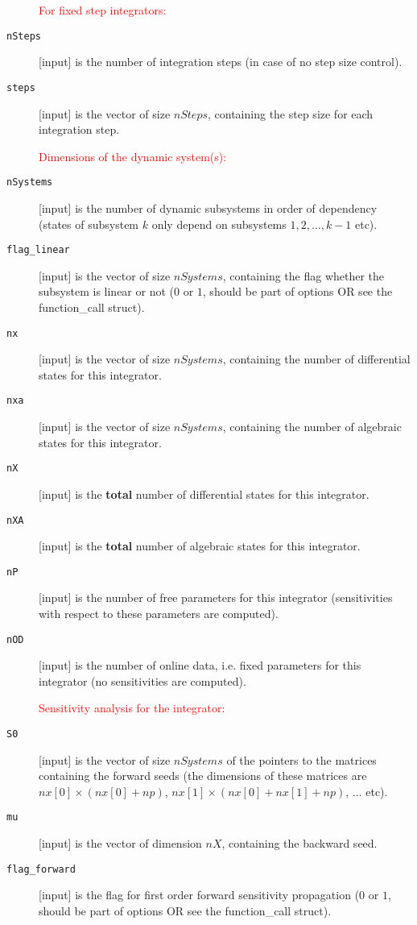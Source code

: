 \documentclass{report}
\begin{document}
\begin{description}
\item[] \textcolor{red}{For fixed step integrators:}
\item[{\tt nSteps}] [input] is the number of integration steps (in case of no step size control).
\item[{\tt steps}] [input] is the vector of size $nSteps$, containing the step size for each integration step.
\item[] \textcolor{red}{Dimensions of the dynamic system(s):}
\item[{\tt nSystems}] [input] is the number of dynamic subsystems in order of dependency (states of subsystem $k$ only depend on subsystems $1,2,\ldots, k-1$ etc).
\item[{\tt flag\_linear}] [input] is the vector of size $nSystems$, containing the flag whether the subsystem is linear or not ($0$ or $1$, should be part of options OR see the function\_call struct).
\item[{\tt nx}] [input] is the vector of size $nSystems$, containing the number of differential states for this integrator.
\item[{\tt nxa}] [input] is the vector of size $nSystems$, containing the number of algebraic states for this integrator.
\item[{\tt nX}] [input] is the {\bf total} number of differential states for this integrator.
\item[{\tt nXA}] [input] is the {\bf total} number of algebraic states for this integrator.
\item[{\tt nP}] [input] is the number of free parameters for this integrator (sensitivities with respect to these parameters are computed).
\item[{\tt nOD}] [input] is the number of online data, i.e. fixed parameters for this integrator (no sensitivities are computed).
\item[] \textcolor{red}{Sensitivity analysis for the integrator:}
\item[{\tt S0}] [input] is the vector of size $nSystems$ of the pointers to the matrices containing the forward seeds (the dimensions of these matrices are $nx[0] \times (nx[0]+np)$, $nx[1] \times (nx[0]+nx[1]+np)$, $\ldots$ etc).
\item[{\tt mu}] [input] is the vector of dimension $nX$, containing the backward seed.
\item[{\tt flag\_forward}] [input] is the flag for first order forward sensitivity propagation ($0$ or $1$, should be part of options OR see the function\_call struct).

\end{description}
\end{document}
